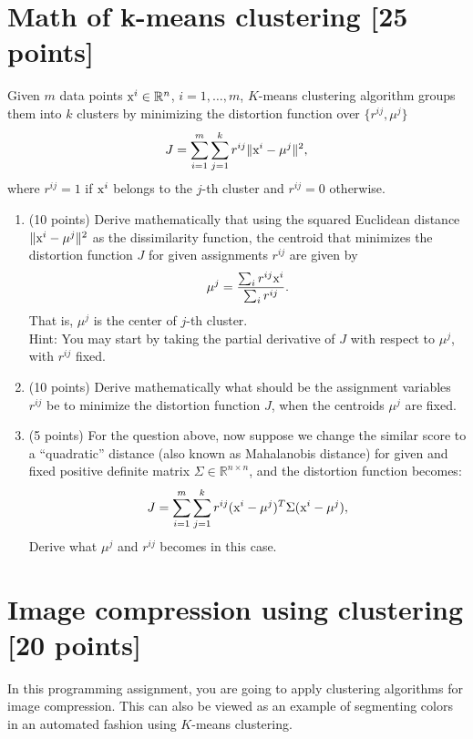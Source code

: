 \documentclass[twoside,10pt]{article}
\begin{document}
\section{Math of k-means clustering [25 points]}
 Given $m$ data points $\text x^i \in \mathbb R^{n}$, $i=1,\dots, m$, $K$-means clustering algorithm groups them into $k$ clusters by minimizing the distortion function over $\{ r^{ij}, \mu^j \}$
\begin{equation}
J =\sum_{i=1}^m\sum_{j=1}^k r^{ij} \|\text x^i-\mu^j\|^2,
\label{J_def}
\end{equation}
where $r^{ij}=1$ if $\text x^i$ belongs to the $j$-th cluster and $r^{ij}=0$ otherwise.

\begin{enumerate}

\item (10 points) Derive mathematically that using the squared Euclidean distance $\|\text x^i-\mu^j\|^2$ as the dissimilarity function, the centroid that minimizes the distortion function $J$  for given assignments $r^{ij}$ are given by
   $$\mu^j=\frac{\sum_i r^{ij} \text x^i}{\sum_i r^{ij}}.$$
   That is, $\mu^j$ is the center of $j$-th cluster.  \\
   Hint: You may start by taking the partial derivative of $J$ with respect to $\mu^j$, with $r^{ij}$ fixed.
   
   
\item (10 points) Derive mathematically what should be the assignment variables $r^{ij}$ be to minimize the distortion function $J$, when the centroids $\mu^j$ are fixed.

\item (5 points) For the question above, now suppose we change the similar score to a ``quadratic'' distance (also known as Mahalanobis distance) for given and fixed positive definite matrix $\Sigma \in \mathbb R^{n\times n}$, and the distortion function becomes:
\[
J =\sum_{i=1}^m\sum_{j=1}^k r^{ij} (\text x^i-\mu^j)^T \Sigma  (\text x^i-\mu^j),
\]
Derive what $\mu^{j}$ and $r^{ij}$ becomes in this case.

\end{enumerate}



\section{Image compression using clustering [20 points]}

In this programming assignment, you are going to apply clustering algorithms for image compression. This can also be viewed as an example of segmenting colors in an automated fashion using $K$-means clustering.
\end{document}
